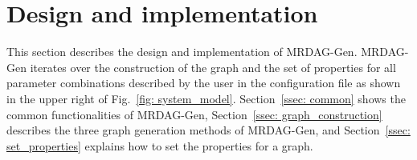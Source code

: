\section{Design and implementation}
\label{sec: design_implementation}

This section describes the design and implementation of MRDAG-Gen.
MRDAG-Gen iterates over the construction of the graph and the set of properties for all parameter combinations described by the user in the configuration file as shown in the upper right of Fig.~\ref{fig: system_model}.
Section~\ref{ssec: common} shows the common functionalities of MRDAG-Gen, Section~\ref{ssec: graph_construction} describes the three graph generation methods of MRDAG-Gen, and Section~\ref{ssec: set_properties} explains how to set the properties for a graph.



